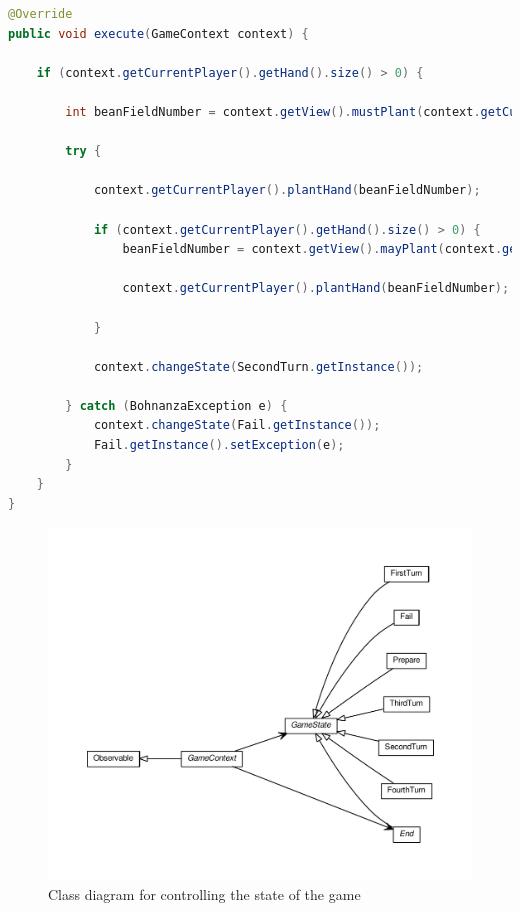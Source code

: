 \begin{lstlisting}[language=Java, caption=FirstTurn.execute(), label=lst:firstturn-execute]
@Override
public void execute(GameContext context) {

    if (context.getCurrentPlayer().getHand().size() > 0) {

        int beanFieldNumber = context.getView().mustPlant(context.getCurrentPlayer());

        try {

            context.getCurrentPlayer().plantHand(beanFieldNumber);
 
            if (context.getCurrentPlayer().getHand().size() > 0) {
                beanFieldNumber = context.getView().mayPlant(context.getCurrentPlayer());

                context.getCurrentPlayer().plantHand(beanFieldNumber);

            }

            context.changeState(SecondTurn.getInstance());

        } catch (BohnanzaException e) {
            context.changeState(Fail.getInstance());
            Fail.getInstance().setException(e);
        }
    }
}
\end{lstlisting}

\begin{figure}[h!]
    \includegraphics[width=\textwidth]{../umlgraph/StateGraph}
    \caption{Class diagram for controlling the state of the game}
    \label{fig:design:controller}
\end{figure}

